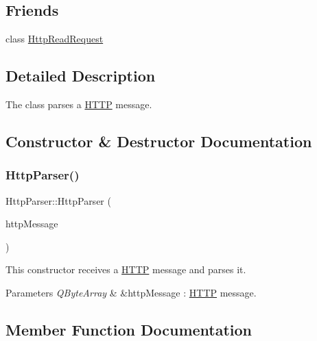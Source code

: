 \subsection*{Friends}
\begin{DoxyCompactItemize}
\item 
class \hyperlink{class_http_parser_a4d54f5003e07e218070a449c22a52c7c}{Http\+Read\+Request}
\end{DoxyCompactItemize}


\subsection{Detailed Description}
The class parses a \hyperlink{namespace_h_t_t_p}{H\+T\+TP} message. 

\subsection{Constructor \& Destructor Documentation}
\mbox{\label{class_http_parser_a91e6c1876337b53694347476f277d1a2}} 
\subsubsection{\texorpdfstring{Http\+Parser()}{HttpParser()}}
{\footnotesize\ttfamily Http\+Parser\+::\+Http\+Parser (\begin{DoxyParamCaption}\item[{Q\+Byte\+Array \&}]{http\+Message }\end{DoxyParamCaption})\hspace{0.3cm}{\ttfamily [explicit]}}



This constructor receives a \hyperlink{namespace_h_t_t_p}{H\+T\+TP} message and parses it. 


\begin{DoxyParams}{Parameters}
{\em Q\+Byte\+Array} & \&http\+Message \+: \hyperlink{namespace_h_t_t_p}{H\+T\+TP} message. \\
\hline
\end{DoxyParams}


\subsection{Member Function Documentation}
\mbox{\label{class_http_parser_abeee6e30f6494121010bc5498b162870}} 
